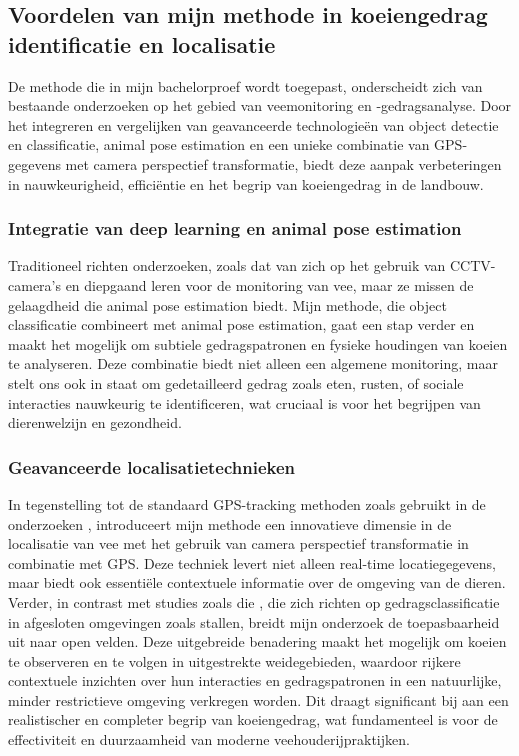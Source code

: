 \subsection{Voordelen van mijn methode in koeiengedrag identificatie en localisatie}
De methode die in mijn bachelorproef wordt toegepast, onderscheidt zich van bestaande onderzoeken op het gebied van veemonitoring en -gedragsanalyse. 
Door het integreren en vergelijken van geavanceerde technologieën van object detectie en classificatie, animal pose estimation en een unieke combinatie van GPS-gegevens met camera perspectief transformatie, biedt deze aanpak verbeteringen in nauwkeurigheid, efficiëntie en het begrip van koeiengedrag in de landbouw.
\subsubsection{Integratie van deep learning en animal pose estimation}
Traditioneel richten onderzoeken, zoals dat van \textcite{Fuentes2023} zich op het gebruik van CCTV-camera’s en diepgaand leren voor de monitoring van vee, maar ze missen de gelaagdheid die animal pose estimation biedt. 
Mijn methode, die object classificatie combineert met animal pose estimation, gaat een stap verder en maakt het mogelijk om subtiele gedragspatronen en fysieke houdingen van koeien te analyseren. 
Deze combinatie biedt niet alleen een algemene monitoring, maar stelt ons ook in staat om gedetailleerd gedrag zoals eten, rusten, of sociale interacties nauwkeurig te identificeren, wat cruciaal is voor het begrijpen van dierenwelzijn en gezondheid.
\subsubsection{Geavanceerde localisatietechnieken}
In tegenstelling tot de standaard GPS-tracking methoden zoals gebruikt in de onderzoeken \textcite{halachmi2019smart}, introduceert mijn methode een innovatieve dimensie in de localisatie van vee met het gebruik van camera perspectief transformatie in combinatie met GPS. 
Deze techniek levert niet alleen real-time locatiegegevens, maar biedt ook essentiële contextuele informatie over de omgeving van de dieren. Verder, in contrast met studies zoals die \textcite{Fuentes2023}, die zich richten op gedragsclassificatie in afgesloten omgevingen zoals stallen, breidt mijn onderzoek de toepasbaarheid uit naar open velden. Deze uitgebreide benadering maakt het mogelijk om koeien te observeren en te volgen in uitgestrekte weidegebieden, waardoor rijkere contextuele inzichten over hun interacties en gedragspatronen in een natuurlijke, minder restrictieve omgeving verkregen worden. 
Dit draagt significant bij aan een realistischer en completer begrip van koeiengedrag, wat fundamenteel is voor de effectiviteit en duurzaamheid van moderne veehouderijpraktijken.
